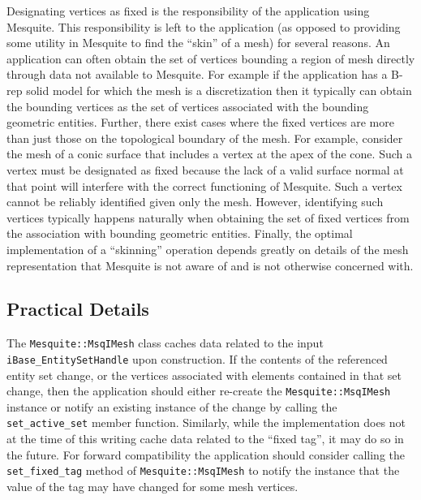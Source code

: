 Designating vertices as fixed is the responsibility of the application using Mesquite.  This responsibility is left to the application (as opposed to providing some utility in Mesquite to find the ``skin'' of a mesh) for several reasons.  An application can often obtain the set of vertices bounding a region of mesh directly through data not available to Mesquite.  For example if the application has a B-rep solid model for which the mesh is a discretization then it typically can obtain the bounding vertices as the set of vertices associated with the bounding geometric entities.  Further, there exist cases where the fixed vertices are more than just those on the topological boundary of the mesh.  For example, consider the mesh of a conic surface that includes a vertex at the apex of the cone.  Such a vertex must be designated as fixed because the lack of a valid surface normal at that point will interfere with the correct functioning of Mesquite.  Such a vertex cannot be reliably identified given only the mesh.  However, identifying such vertices typically happens naturally when obtaining the set of fixed vertices from the association with bounding geometric entities.  Finally, the optimal implementation of a ``skinning'' operation depends greatly on details of the mesh representation that Mesquite is not aware of and is not otherwise concerned with.

\subsection{Practical Details}

The \texttt{Mesquite::MsqIMesh} class caches data related to the input \texttt{iBase\_EntitySetHandle} upon construction.  If the contents of the referenced entity set change, or the vertices associated with elements contained in that set change, then the application should either re-create the \texttt{Mesquite::MsqIMesh} instance or notify an existing instance of the change by calling the \texttt{set\_active\_set} member function.  Similarly, while the implementation does not at the time of this writing cache data related to the ``fixed tag'', it may do so in the future.  For forward compatibility the application should consider calling the \texttt{set\_fixed\_tag} method of \texttt{Mesquite::MsqIMesh} to notify the instance that the value of the tag may have changed for some mesh vertices.

